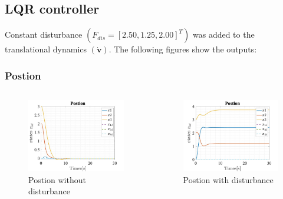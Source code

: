 \documentclass{beamer}
\begin{document}
\subsection{LQR controller}
\begin{frame}

    Constant disturbance $\left(F_{d i s}=[2.50,1.25,2.00]^{T}\right)$ was added to the translational dynamics $(\dot{\boldsymbol{v}})$. The following figures show the outputs:
\end{frame}
\begin{frame}
    \frametitle{Postion}

    \begin{columns}

        \begin{figure}[h]
            \centering
            \includegraphics[width=1\textwidth]{Postion_T_LQR.jpg}
            \caption{Postion without disturbance}
        \end{figure}

        \begin{figure}[h]
            \centering
            \includegraphics[width=1\textwidth]{Postion_T_LQR_Dist.jpg}
            \caption{Postion with disturbance}
        \end{figure}
    \end{columns}
\end{frame}
\end{document}
